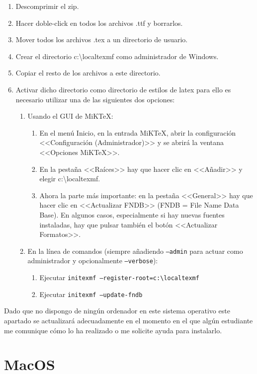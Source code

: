 \documentclass[numerado,carta]{plantillasEPS} %
\begin{document}
\begin{enumerate}
  \item Descomprimir el zip.
  \item Hacer doble-click en todos los archivos .ttf y borrarlos.
  \item Mover todos los archivos .tex a un directorio de usuario. 
  \item Crear el directorio c:{\textbackslash}localtexmf como administrador de Windows.
  \item Copiar el resto de los archivos a este directorio.
  \item Activar dicho directorio como directorio de estilos de latex para ello es necesario utilizar una de las siguientes dos opciones:
  \begin{enumerate}
    \item Usando el GUI de MiKTeX:
    \begin{enumerate} 
      \item En el menú Inicio, en la entrada MiKTeX, abrir la configuración <<Configuración (Administrador)>> y se abrirá la ventana <<Opciones MiKTeX>>.
      \item En la pestaña <<Raíces>> hay que hacer clic en <<Añadir>> y elegir c:{\textbackslash}localtexmf.
      \item Ahora la parte más importante: en la pestaña <<General>> hay que hacer clic en <<Actualizar FNDB>> (FNDB = File Name Data Base). En algunos casos, especialmente si hay nuevas fuentes instaladas, hay que pulsar también el botón <<Actualizar Formatos>>.
    \end{enumerate}
    \item En la línea de comandos (siempre añadiendo \texttt{--admin} para actuar como administrador y opcionalmente \texttt{--verbose}):
    \begin{enumerate}
      \item Ejecutar \texttt{initexmf --register-root=c:{\textbackslash}localtexmf}
      \item Ejecutar \texttt{initexmf --update-fndb}
    \end{enumerate}
  \end{enumerate}
\end{enumerate}

Dado que no dispongo de ningún ordenador en este sistema operativo este apartado se actualizará adecuadamente en el momento en el que algún estudiante me comunique cómo lo ha realizado o me solicite ayuda para instalarlo.

\section{MacOS}
\end{document}
